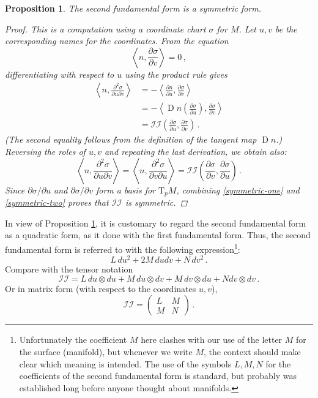 \documentclass[12pt]{article}
\DeclareMathOperator{\D}{D}
\newcommand{\TpM}{\mathrm{T}_p M}
\newcommand{\ctwo}{\mathcal{II}}
\newtheorem{prop}{Proposition}
\begin{document}
\begin{prop}\label{symmetric}
The second fundamental form is a symmetric form.
\begin{proof}
This is a computation using a coordinate chart $\sigma$ for $M$.
Let $u, v$ be the corresponding names for the coordinates.
From the equation
\[
\left\langle  n, \frac{\partial \sigma}{\partial v} \right\rangle = 0\,,
\]
differentiating with respect to $u$ using the product rule gives
\begin{equation}\label{symmetric-one}
\begin{split}
\left\langle  n, \frac{\partial^2 \sigma}{\partial u \partial v} \right\rangle &=
- \left\langle \frac{\partial  n}{\partial u}, \frac{\partial \sigma}{\partial v} \right\rangle \\
&= - \left\langle \D  n\left( \frac{\partial \sigma}{\partial u} \right), \frac{\partial \sigma}{\partial v} \right\rangle  \\
&= \ctwo\left(\frac{\partial \sigma}{\partial u}, \frac{\partial \sigma}{\partial v}\right)\,.
\end{split}
\end{equation}
(The second equality follows from the definition of the tangent map $\D n$.)
Reversing the roles of $u, v$ and repeating the last derivation,
we obtain also:
\begin{equation}\label{symmetric-two}
\left\langle  n, \frac{\partial^2 \sigma}{\partial u \partial v} \right\rangle = \left\langle  n, \frac{\partial^2 \sigma}{\partial v \partial u} \right\rangle =
\ctwo\left(\frac{\partial \sigma}{\partial v}, \frac{\partial \sigma}{\partial u}\right)\,.
\end{equation}
Since $\partial \sigma/\partial u$ and $\partial \sigma/\partial v$
form a basis for $\TpM$, combining
\eqref{symmetric-one} and \eqref{symmetric-two} proves that $\mathcal{II}$ is symmetric.
\end{proof}
\end{prop}

In view of Proposition \ref{symmetric},
it is customary to regard the second fundamental form
as a quadratic form,
as it done with the first fundamental form.
Thus, the second fundamental form is referred to with the following expression\footnote{
Unfortunately the coefficient $M$ here clashes with our use of the letter $M$ for
the surface (manifold), but whenever we write $M$, the context should make clear 
which meaning is intended.
The use of the symbols $L, M, N$ for the coefficients of the second fundamental form
is standard, but probably was established long before
anyone thought about manifolds.}:
\[
L \, du^2 + 2M \, dudv + N \, dv^2\,.
\]
Compare with the tensor notation
\[
\ctwo = L \, du \otimes du + M \, du \otimes dv + M \, dv \otimes du + N dv \otimes dv\,.
\]
Or in matrix form (with respect to the coordinates $u, v$),
\[
\ctwo = \begin{pmatrix}
L & M \\
M & N
\end{pmatrix}\,.
\]
\end{document}
